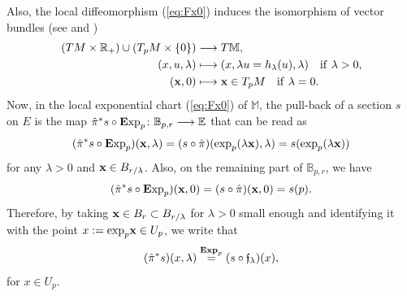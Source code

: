 \documentclass[pdftex]{sigma}
\numberwithin{equation}{section}
\theoremstyle{definition}
\newcommand{\R}{\mathbb R}
\newcommand{\B}{\mathbb B}
\newcommand{\M}{\mathbb M}
\newcommand{\E}{\mathbb E}
\newcommand{\Exp}{{\mathbf E}{\rm xp}}
\begin{document}
Also, the local diffeomorphism (\ref{eq:Fx0}) induces the isomorphism of vector bundles (see \cite[Remark~3.4\,(e)]{DS2} and \cite[pp.~67--68]{F})
\begin{align*}
	(TM\times\R_+)\cup (T_pM\times \{0\})&\longrightarrow T\M,\\
	 (x, u, \lambda)&\longmapsto (x, \lambda u= h_\lambda(u), \lambda) \quad {\rm if}\ \lambda>0,\\
	 (\mathbf{x},0)&\longmapsto \mathbf{x}\in T_{p}M \quad {\rm if}\ \lambda=0.
\end{align*}
 Now, in the local exponential chart (\ref{eq:Fx0}) of $\M$, the pull-back of a section $s$ on $E$ is the map $\hat\pi^*s\circ\Exp_p\colon \B_{p,r}\longrightarrow \E$ that can be read as
\[(\hat\pi^*s\circ\Exp_p)({\bf x},\lambda)=(s\circ \hat\pi)({\rm exp}_p(\lambda {\bf x}),\lambda)=s({\rm exp}_p(\lambda {\bf x}))\]
for any $\lambda>0$ and ${\bf x}\in B_{r/
\lambda}$. Also, on the remaining part of $\B_{p,r}$, we have
\[(\hat\pi^*s\circ\Exp_p)({\bf x},0)=(s\circ\hat\pi)({\bf x},0)=s(p).\]
Therefore, by taking ${\bf x}\in B_r\subset B_{r/
\lambda}$ for $\lambda>0$ small enough and identifying it with the point $x:={\rm exp}_p{\bf x}\in U_p$, we write that
\begin{equation*}%
(\hat \pi^* s)(x,\lambda)\overset{\text{\bf Exp}_p}{=}(s\circ \mathfrak{f}_\lambda)(x),
 \end{equation*}
for $x\in U_p$.
\end{document}
